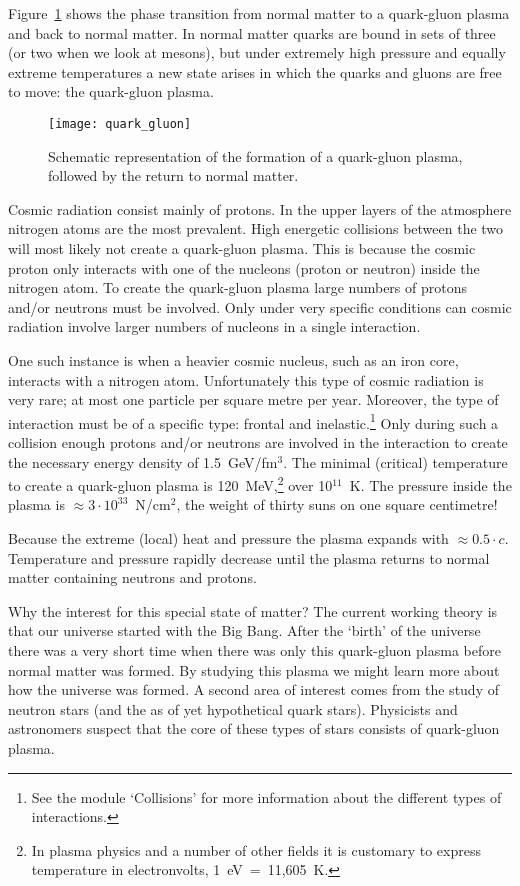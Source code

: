 Figure~\ref{fig:quark_gluon} shows the phase transition from normal matter to a quark-gluon plasma and back to normal matter. In normal matter quarks are bound in sets of three (or two when we look at mesons), but under extremely high pressure and equally extreme temperatures a new state arises in which the quarks and gluons are free to move: the quark-gluon plasma.

\begin{figure}\begin{center}
\texttt{[image: quark\_gluon]}%
\caption{Schematic representation of the formation of a quark-gluon plasma, followed by the return to normal matter.}\label{fig:quark_gluon}
\end{center}\end{figure}

Cosmic radiation consist mainly of protons. In the upper layers of the atmosphere nitrogen atoms are the most prevalent. High energetic collisions between the two will most likely not create a quark-gluon plasma. This is because the cosmic proton only interacts with one of the nucleons (proton or neutron) inside the nitrogen atom. To create the quark-gluon plasma large numbers of protons and/or neutrons must be involved. Only under very specific conditions can cosmic radiation involve larger numbers of nucleons in a single interaction.

One such instance is when a heavier cosmic nucleus, such as an iron core, interacts with a nitrogen atom. Unfortunately this type of cosmic radiation is very rare; at most one particle per square metre per year. Moreover, the type of interaction must be of a specific type: frontal and inelastic.\footnote{See the module `Collisions' for more information about the different types of interactions.} Only during such a collision enough protons and/or neutrons are involved in the interaction to create the necessary energy density of 1.5~GeV/fm$^3$. The minimal (critical) temperature to create a quark-gluon plasma is 120~MeV,\footnote{In plasma physics and a number of other fields it is customary to express temperature in electronvolts, 1~eV~=~11,605~K.} over 10$^{11}$~K. The pressure inside the plasma is $\approx 3 \cdot 10^33$~N/cm$^2$, the weight of thirty suns on one square centimetre!

Because the extreme (local) heat and pressure the plasma expands with $\approx 0.5 \cdot c$. Temperature and pressure rapidly decrease until the plasma returns to normal matter containing neutrons and protons.

Why the interest for this special state of matter? The current working theory is that our universe started with the Big Bang. After the `birth' of the universe there was a very short time when there was only this quark-gluon plasma before normal matter was formed. By studying this plasma we might learn more about how the universe was formed. A second area of interest comes from the study of neutron  stars (and the as of yet hypothetical quark stars). Physicists and astronomers suspect that the core of these types of stars consists of quark-gluon plasma.
 

